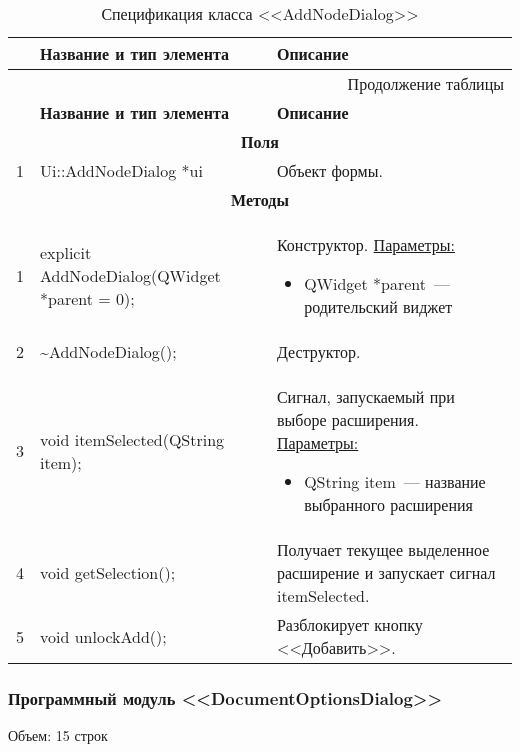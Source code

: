 \small
\singlespacing
\begin{longtable}[h]{|p{}|p{}|p{}|}
  \caption{Спецификация класса <<AddNodeDialog>>}
	\\ \hline
	  \textbf{\No}                  &
	  \textbf{Название и тип элемента}  &
	  \textbf{Описание}
	\\ \hline
  \endfirsthead

  \multicolumn{3}{r}{Продолжение таблицы \thetable{}}
  \\ \hline
	  \textbf{\No}                  &
	  \textbf{Название и тип элемента}  &
	  \textbf{Описание}
	\\ \hline
  \endhead

  \multicolumn{3}{|c|}{\textbf{Поля}} \\
  \hline
  1 & Ui::AddNodeDialog *ui & Объект формы. \\ \hline

  \multicolumn{3}{|c|}{\textbf{Методы}} \\
  \hline
  1 & explicit AddNodeDialog(QWidget *parent = 0); &
    Конструктор.\newline
    \uline{Параметры:}
    \begin{itemize}[nolistsep,label=,leftmargin=0cm]
      \item QWidget *parent~--- родительский виджет
    \end{itemize}\\ \hline
  2 & \textasciitilde AddNodeDialog(); & Деструктор. \\ \hline
  3 & void itemSelected(QString item); & Сигнал, запускаемый при выборе расширения.\newline
    \uline{Параметры:}
    \begin{itemize}[nolistsep,label=,leftmargin=0cm]
      \item QString item~--- название выбранного расширения
    \end{itemize}\\ \hline
  4 & void getSelection(); & Получает текущее выделенное расширение и запускает сигнал itemSelected.\\ \hline
  5 & void unlockAdd(); & Разблокирует кнопку <<Добавить>>.\\ \hline
\end{longtable}
\normalsize
\onehalfspacing


\subsubsection*{Программный модуль <<DocumentOptionsDialog>>}
Объем: 15 строк


